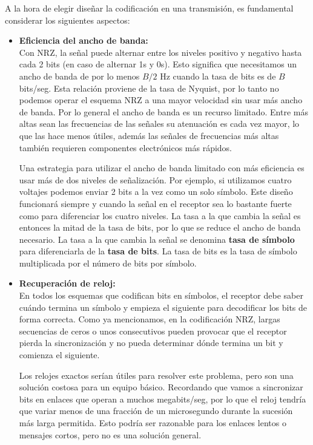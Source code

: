 A la hora de elegir diseñar la codificación en una transmisión, es fundamental considerar los siguientes aspectos:

\begin{itemize}
  \item \textbf{Eficiencia del ancho de banda:} \\
  Con NRZ, la señal puede alternar entre los niveles positivo y negativo hasta cada 2 bits (en caso de alternar 1s y 0s). Esto significa que necesitamos un ancho de banda de por lo menos $B/2$ Hz cuando la tasa de bits es de $B$ bits/seg. Esta relación proviene de la tasa de Nyquist, por lo tanto no podemos operar el esquema NRZ a una mayor velocidad sin usar más ancho de banda. Por lo general el ancho de banda es un recurso limitado. Entre más altas sean las frecuencias de las señales su atenuación es cada vez mayor, lo que las hace menos útiles, además las señales de frecuencias más altas también requieren componentes electrónicos más rápidos.

  Una estrategia para utilizar el ancho de banda limitado con más eficiencia es usar más de dos niveles de señalización. Por ejemplo, si utilizamos cuatro voltajes podemos enviar 2 bits a la vez como un solo símbolo. Este diseño funcionará siempre y cuando la señal en el receptor sea lo bastante fuerte como para diferenciar los cuatro niveles. La tasa a la que cambia la señal es entonces la mitad de la tasa de bits, por lo que se reduce el ancho de banda necesario. La tasa a la que cambia la señal se denomina \textbf{tasa de símbolo} para diferenciarla de la \textbf{tasa de bits}. La tasa de bits es la tasa de símbolo multiplicada por el número de bits por símbolo.

  \item \textbf{Recuperación de reloj:} \\
  En todos los esquemas que codifican bits en símbolos, el receptor debe saber cuándo termina un símbolo y empieza el siguiente para decodificar los bits de forma correcta. Como ya mencionamos, en la codificación NRZ, largas secuencias de ceros o unos consecutivos pueden provocar que el receptor pierda la sincronización y no pueda determinar dónde termina un bit y comienza el siguiente.

  Los relojes exactos serían útiles para resolver este problema, pero son una solución costosa para un equipo básico. Recordando que vamos a sincronizar bits en enlaces que operan a muchos megabits/seg, por lo que el reloj tendría que variar menos de una fracción de un microsegundo durante la sucesión más larga permitida. Esto podría ser razonable para los enlaces lentos o mensajes cortos, pero no es una solución general.


\end{itemize}
